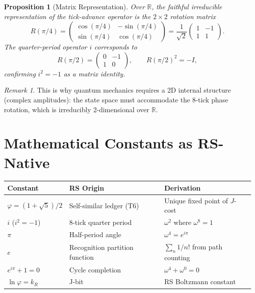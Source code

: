 \documentclass[12pt,a4paper]{article}
\newtheorem{proposition}[theorem]{Proposition}
\theoremstyle{definition}
\theoremstyle{remark}
\newtheorem{remark}[theorem]{Remark}
\begin{document}
\begin{proposition}[Matrix Representation]
\label{prop:matrix}
Over $\mathbb{R}$, the faithful irreducible representation
of the tick-advance operator is the $2 \times 2$ rotation
matrix
\begin{equation}
  R(\pi/4) = \begin{pmatrix}
    \cos(\pi/4) & -\sin(\pi/4) \\
    \sin(\pi/4) & \cos(\pi/4)
  \end{pmatrix} = \frac{1}{\sqrt{2}}
  \begin{pmatrix} 1 & -1 \\ 1 & 1 \end{pmatrix}.
\end{equation}
The quarter-period operator $i$ corresponds to
\begin{equation}
  R(\pi/2) = \begin{pmatrix} 0 & -1 \\ 1 & 0 \end{pmatrix},
  \qquad R(\pi/2)^2 = -I,
\end{equation}
confirming $i^2 = -1$ as a matrix identity.
\end{proposition}

\begin{remark}
This is why quantum mechanics requires a 2D internal
structure (complex amplitudes): the state space must
accommodate the 8-tick phase rotation, which is irreducibly
2-dimensional over $\mathbb{R}$.
\end{remark}

\section{Mathematical Constants as RS-Native}
\label{sec:native}

\begin{center}
\renewcommand{\arraystretch}{1.3}
\begin{tabular}{lll}
\toprule
\textbf{Constant} & \textbf{RS Origin}
  & \textbf{Derivation} \\
\midrule
$\varphi = (1+\sqrt{5})/2$ & Self-similar ledger (T6) &
  Unique fixed point of $J$-cost \\
$i$ \;($i^2 = -1$) & 8-tick quarter period &
  $\omega^2$ where $\omega^8 = 1$ \\
$\pi$ & Half-period angle &
  $\omega^4 = e^{i\pi}$ \\
$e$ & Recognition partition function &
  $\sum_n 1/n!$ from path counting \\
$e^{i\pi} + 1 = 0$ & Cycle completion &
  $\omega^4 + \omega^0 = 0$ \\
$\ln\varphi = k_R$ & J-bit &
  RS Boltzmann constant \\
\bottomrule
\end{tabular}
\end{center}
\end{document}
